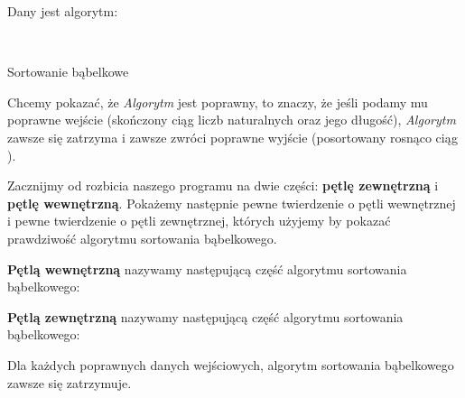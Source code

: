 \begin{example}
Dany jest algorytm:

\begin{algorithm}[H]

\


\SetAlgoLined


 \caption{Sortowanie bąbelkowe}
\end{algorithm}

Chcemy pokazać, że \textit{Algorytm} jest poprawny, to znaczy, że jeśli podamy mu poprawne wejście (skończony ciąg  liczb naturalnych oraz jego długość), \textit{Algorytm} zawsze się zatrzyma i zawsze zwróci poprawne wyjście (posortowany rosnąco ciąg ).

Zacznijmy od rozbicia naszego programu na dwie części: \textbf{pętlę zewnętrzną} i \textbf{pętlę wewnętrzną}. Pokażemy następnie pewne twierdzenie o pętli wewnętrznej i pewne twierdzenie o pętli zewnętrznej, których użyjemy by pokazać prawdziwość algorytmu sortowania bąbelkowego.

\begin{definition}
\textbf{Pętlą wewnętrzną} nazywamy następującą część algorytmu sortowania bąbelkowego:

\begin{algorithm}
\end{algorithm}
\end{definition}

\begin{definition}
\textbf{Pętlą zewnętrzną } nazywamy następującą część algorytmu sortowania bąbelkowego:

\begin{algorithm}
\end{algorithm}
\end{definition}

\begin{theo}
\label{theo:bubble_stop}
Dla każdych poprawnych danych wejściowych, algorytm sortowania bąbelkowego zawsze się zatrzymuje.
\end{theo}


\end{example}
